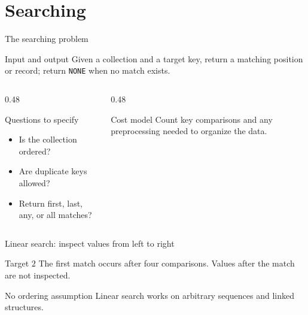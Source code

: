 \documentclass[aspectratio=169]{beamer}
\begin{document}
\section{ Searching}

\begin{frame}{The searching problem}
  \begin{block}{Input and output}
    Given a collection and a target key, return a matching position or record;
    return \texttt{NONE} when no match exists.
  \end{block}
  \begin{columns}[T]
    \begin{column}{0.48\textwidth}
      \begin{exampleblock}{Questions to specify}
        \begin{itemize}
          \item Is the collection ordered?
          \item Are duplicate keys allowed?
          \item Return first, last, any, or all matches?
        \end{itemize}
      \end{exampleblock}
    \end{column}
    \begin{column}{0.48\textwidth}
      \begin{alertblock}{Cost model}
        Count key comparisons and any preprocessing needed to organize the data.
      \end{alertblock}
    \end{column}
  \end{columns}
\end{frame}

\begin{frame}{Linear search: inspect values from left to right}
  \begin{center}
  \end{center}
  \begin{block}{Target $2$}
    The first match occurs after four comparisons. Values after the match are
    not inspected.
  \end{block}
  \begin{alertblock}{No ordering assumption}
    Linear search works on arbitrary sequences and linked structures.
  \end{alertblock}
\end{frame}
\end{document}
